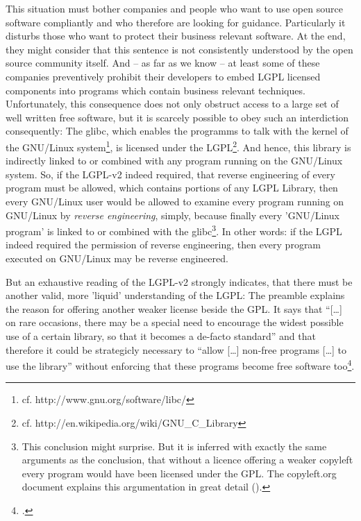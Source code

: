 This situation must bother companies and people who want to use open source
software compliantly and who therefore are looking for guidance. Particularly it
disturbs those who want to protect their business relevant software. At the end,
they might consider that this sentence is not consistently understood by the
open source community itself. And -- as far as we know -- at least some of these
companies preventively prohibit their developers to embed LGPL licensed
components into programs which contain business relevant techniques.
Unfortunately, this consequence does not only obstruct access to a large set of
well written free software, but it is scarcely possible to obey such an
interdiction consequently: The glibc, which enables the programms to talk with
the kernel of the GNU/Linux system\footnote{cf.
http://www.gnu.org/software/libc/}, is licensed under the LGPL\footnote{cf.
http://en.wikipedia.org/wiki/GNU\_C\_Library}. And hence, this library is
indirectly linked to or combined with any program running on the GNU/Linux
system. So, if the LGPL-v2 indeed required, that reverse engineering of every
program must be allowed, which contains portions of any LGPL Library, then every
GNU/Linux user would be allowed to examine every program running on GNU/Linux by
\emph{reverse engineering}, simply, because finally every 'GNU/Linux program' is
linked to or combined with the glibc\footnote{This conclusion might surprise.
But it is inferred with exactly the same arguments as the conclusion, that
without a licence offering a weaker copyleft every program would have been
licensed under the GPL. The copyleft.org document explains this argumentation in
great detail (\cite[cf.][56f]{KuhSebGin2014a}).}. In other words: if the LGPL
indeed required the permission of reverse engineering, then
every program executed on GNU/Linux may be reverse engineered.

But an exhaustive reading of the LGPL-v2 strongly indicates, that there must be
another valid, more 'liquid' understanding of the LGPL: The preamble explains
the reason for offering another weaker license beside the GPL. It says that
\enquote{[\ldots] on rare occasions, there may be a special need to encourage
the widest possible use of a certain library, so that it becomes a de-facto
standard} and that therefore it could be strategicly necessary to \enquote{allow
[\ldots] non-free programs [\ldots] to use the library} without enforcing that
these programs become free software too\footcite[cf.][\nopage wp,
§preamble]{Lgpl21OsiLicense1999a}.

